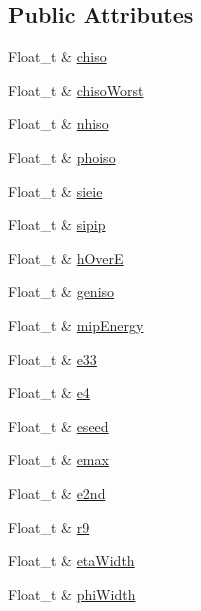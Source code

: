 \subsection*{Public Attributes}
\begin{DoxyCompactItemize}
\item 
Float\_\-t \& \hyperlink{classpanda_1_1Photon_acce389c356c5a27d94acce9389fe52c7}{chiso}
\item 
Float\_\-t \& \hyperlink{classpanda_1_1Photon_af73244ae1fd6ee690fd1708b93aa2bf4}{chisoWorst}
\item 
Float\_\-t \& \hyperlink{classpanda_1_1Photon_af95048c6f5af39e414c4ba340db4f18a}{nhiso}
\item 
Float\_\-t \& \hyperlink{classpanda_1_1Photon_a215beafd131342ba08293d3afcef3a4d}{phoiso}
\item 
Float\_\-t \& \hyperlink{classpanda_1_1Photon_aec8fd29f109fca5af35837636adabad1}{sieie}
\item 
Float\_\-t \& \hyperlink{classpanda_1_1Photon_aa8ef9d3d55d9faf08dcdb3f12becb9fb}{sipip}
\item 
Float\_\-t \& \hyperlink{classpanda_1_1Photon_a18c3e64f7669abe3651878f1efa869b6}{hOverE}
\item 
Float\_\-t \& \hyperlink{classpanda_1_1Photon_aec38248ea895ba7625c1f92027ba640f}{geniso}
\item 
Float\_\-t \& \hyperlink{classpanda_1_1Photon_af1a71cb6723f1a3b51bc60f5ca307261}{mipEnergy}
\item 
Float\_\-t \& \hyperlink{classpanda_1_1Photon_aa3dbc87388b7b6ec2d291c21055e9590}{e33}
\item 
Float\_\-t \& \hyperlink{classpanda_1_1Photon_a5db8a2e28e7e48c46faec4a715e83c42}{e4}
\item 
Float\_\-t \& \hyperlink{classpanda_1_1Photon_a85e3449e0e8a9c4545098e6dea2a4539}{eseed}
\item 
Float\_\-t \& \hyperlink{classpanda_1_1Photon_abf9d56c9d8259af492768022287f6f35}{emax}
\item 
Float\_\-t \& \hyperlink{classpanda_1_1Photon_a83e90e21bf396baabd3d4d5fef868df9}{e2nd}
\item 
Float\_\-t \& \hyperlink{classpanda_1_1Photon_a1bd8fbf333d29dcff3ad236416743967}{r9}
\item 
Float\_\-t \& \hyperlink{classpanda_1_1Photon_a361bdca9a6e0b40fcffbb186382c8438}{etaWidth}
\item 
Float\_\-t \& \hyperlink{classpanda_1_1Photon_ae8f5ffc094db0888fd6a575d2dc94f9c}{phiWidth}
\item 

\end{DoxyCompactItemize}

